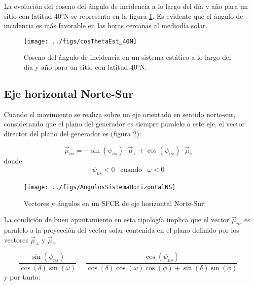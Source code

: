 La evolución del coseno del ángulo de incidencia a lo largo del día
y año para un sitio con latitud $\ang{40}\mathrm{N}$ se representa
en la figura \ref{fig:cosThetaEst}. Es evidente que el ángulo de
incidencia es más favorable en las horas cercanas al mediodía solar.

%
\begin{figure}
\texttt{[image: ../figs/cosThetaEst\_40N]}

\caption{Coseno del ángulo de incidencia en un sistema estático a lo largo
del día y año para un sitio con latitud $\ang{40}\mathrm{N}$.\label{fig:cosThetaEst}}

\end{figure}



\subsection{Eje horizontal Norte-Sur}

Cuando el movimiento se realiza sobre un eje orientado en sentido
norte-sur, considerando que el plano del generador es siempre paralelo
a este eje, el vector director del plano del generador es (figura
\ref{fig:HorizontalNS}):

\begin{equation}
\vec{\mu}_{ns}=-\sin(\psi_{ns})\cdot\vec{\mu}_{\bot}+\cos(\psi_{ns})\cdot\vec{\mu}_{c}\end{equation}
donde
\begin{equation}
\begin{array}{ccc}
\psi_{ns}<0 & \mathrm{cuando} & \omega<0\end{array}\end{equation}


%
\begin{figure}
\texttt{[image: ../figs/AngulosSistemaHorizontalNS]}

\caption{Vectores y ángulos en un SFCR de eje horizontal Norte-Sur.\label{fig:HorizontalNS}}

\end{figure}


La condición de buen apuntamiento en esta tipología implica que el
vector $\vec{\mu}_{ns}$ es paralelo a la proyección del vector solar
contenida en el plano definido por los vectores $\vec{\mu}_{\bot}$
y $\vec{\mu}_{c}$:

\begin{equation}
\frac{\sin(\psi_{ns})}{\cos\left(\delta\right)\sin\left(\omega\right)}=\frac{\cos(\psi_{ns})}{\cos\left(\delta\right)\cos\left(\omega\right)\cos\left(\phi\right)+\sin\left(\delta\right)\sin\left(\phi\right)}\end{equation}
y por tanto:

